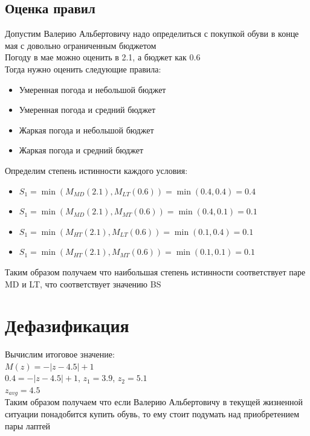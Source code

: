 \documentclass[12pt,a4paper]{report}
\begin{document}
\subsection*{Оценка правил}
Допустим Валерию Альбертовичу надо определиться с покупкой обуви в конце мая 
с довольно ограниченным бюджетом\\
Погоду в мае можно оценить в 2.1, а бюджет как 0.6\\
Тогда нужно оценить следующие правила:
\begin{itemize}
    \item Умеренная погода и небольшой бюджет
    \item Умеренная погода и средний бюджет
    \item Жаркая погода и небольшой бюджет
    \item Жаркая погода и средний бюджет
\end{itemize}
Определим степень истинности каждого условия:
\begin{itemize}
    \item $S_1=\min(M_{MD}(2.1), M_{LT}(0.6))=\min(0.4, 0.4)=0.4$
    \item $S_1=\min(M_{MD}(2.1), M_{MT}(0.6))=\min(0.4, 0.1)=0.1$
    \item $S_1=\min(M_{HT}(2.1), M_{LT}(0.6))=\min(0.1, 0.4)=0.1$
    \item $S_1=\min(M_{HT}(2.1), M_{MT}(0.6))=\min(0.1, 0.1)=0.1$
\end{itemize}
Таким образом получаем что наибольшая степень истинности соответствует паре MD и LT, что соответствует значению BS
\section*{Дефазификация}
Вычислим итоговое значение: \\
\hfill\break
$M(z)=- |z-4.5|+1$ \\
$0.4=- |z-4.5|+1$, $z_1=3.9$, $z_2=5.1$ \\
$z_{avg}=4.5$ \\
\hfill\break
Таким образом получаем что если Валерию Альбертовичу в текущей жизненной ситуации понадобится купить обувь, то ему стоит подумать над приобретением пары лаптей
\end{document}
